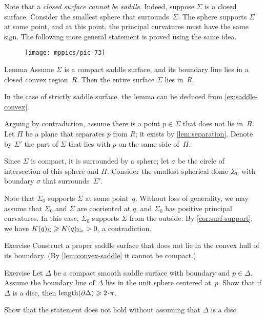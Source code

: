 Note that a \textit{closed surface cannot be saddle}.
Indeed, suppose $\Sigma$ is a closed surface.
Consider the smallest sphere that surrounds~$\Sigma$.
The sphere supports $\Sigma$ at some point, and at this point, the principal curvatures must have the same sign.
The following more general statement is proved using the same idea.

{

\begin{wrapfigure}[6]{r}{45 mm}
\vskip-6mm
\centering
\texttt{[image: mppics/pic-73]}
\vskip0mm
\end{wrapfigure}

\begin{thm}{Lemma}\label{lem:convex-saddle}
Assume $\Sigma$ is a compact saddle surface, and its boundary line lies in a closed convex  region~$R$.
Then the entire surface $\Sigma$ lies in~$R$.
\end{thm}

In the case of strictly saddle surface, the lemma can be deduced from \ref{ex:saddle-convex}.

Arguing by contradiction,
assume there is a point $p\in \Sigma$ that does not lie in~$R$.
Let $\Pi$ be a plane that separates $p$ from $R$; it exists by \ref{lem:separation}.
Denote by $\Sigma'$ the part of $\Sigma$ that lies with $p$ on the same side of~$\Pi$.

}

Since $\Sigma$ is compact, it is surrounded by a sphere;
let $\sigma$ be the circle of intersection of this sphere and $\Pi$.
Consider the smallest spherical dome $\Sigma_0$ with boundary $\sigma$ that surrounds~$\Sigma'$.

Note that $\Sigma_0$ supports $\Sigma$ at some point~$q$.
Without loss of generality, we may assume that $\Sigma_0$ and $\Sigma$ are cooriented at $q$, and $\Sigma_0$ has positive principal curvatures.
In this case, $\Sigma_0$ supports $\Sigma$ from the outside.
By \ref{cor:surf-support}, we have $K(q)_\Sigma\z\ge K(q)_{\Sigma_0}>0$, a contradiction.
\qeds

\begin{thm}{Exercise}\label{ex:proper-saddle}
Construct a proper saddle surface that does not lie in the convex hull of its boundary.
(By \ref{lem:convex-saddle} it cannot be compact.)
\end{thm}


\begin{thm}{Exercise}\label{ex:length-of-bry}
Let $\Delta$ be a compact smooth saddle surface with boundary and $p\in \Delta$.
Assume the boundary line of $\Delta$ lies in the unit sphere centered at~$p$.
Show that if $\Delta$ is a disc, then $\length(\partial\Delta)\ge 2\cdot\pi$.

Show that the statement does not hold without assuming that $\Delta$ is a disc.
\end{thm}

